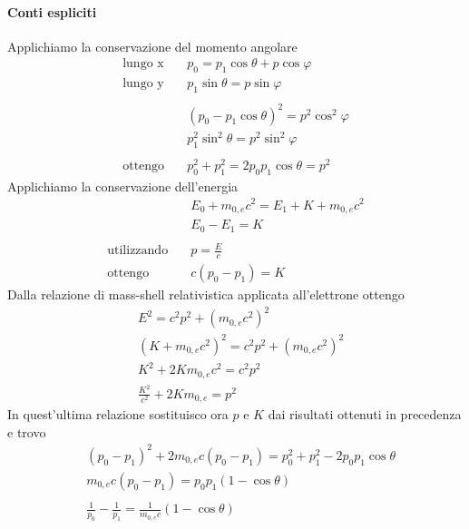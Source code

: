 \paragraph{Conti espliciti}
Applichiamo la conservazione del momento angolare
\begin{equation}
\begin{split}
\mbox{lungo x} \quad & p_0 = p_1 \cos\theta + p \cos\varphi \\
\mbox{lungo y} \quad & p_1 \sin\theta = p \sin\varphi \\ \\
& (p_0 - p_1 \cos\theta)^2 = p^2 \cos^2\varphi \\
& p_1^2 \sin^2\theta = p^2 \sin^2\varphi \\ \\
\mbox{ottengo} \quad & p_0^2 + p_1^2 = 2 p_0 p_1 \cos\theta = p^2
\end{split}
\end{equation}
Applichiamo la conservazione dell'energia
\begin{equation}
\begin{split}
& E_0 + m_{0,e} c^2 = E_1 + K + m_{0,e} c^2 \\
& E_0 - E_1 = K \\ \\
\mbox{utilizzando} \quad & p =\frac{ E}{c } \\
\mbox{ottengo} \quad & c (p_0 - p_1) = K 
\end{split}
\end{equation}
Dalla relazione di mass-shell relativistica applicata all'elettrone ottengo
\begin{equation}
\begin{split}
& E^2 = c^2 p^2 + (m_{0,e} c^2)^2 \\
& (K + m_{0,e} c^2)^2 = c^2 p^2 + (m_{0,e} c^2)^2 \\
& K^2 + 2 K m_{0,e} c^2 = c^2 p^2 \\
& \frac{ K^2}{c^2 } + 2Km_{0,e} = p^2
\end{split}
\end{equation}
In quest'ultima relazione sostituisco ora $p$ e $K$ dai risultati ottenuti in precedenza e trovo
\begin{equation}
\begin{split}
& (p_0 - p_1)^2 + 2m_{0,e} c (p_0 - p_1) = p_0^2 + p_1^2 - 2p_0 p_1 \cos\theta \\
& m_{0,e} c (p_0 - p_1) = p_0 p_1 (1 - \cos\theta) \\ \\
& \frac{ 1}{p_0 } - \frac{ 1}{p_1 } = \frac{ 1}{m_{0,e} c } (1 - \cos\theta)
\end{split}
\end{equation}
